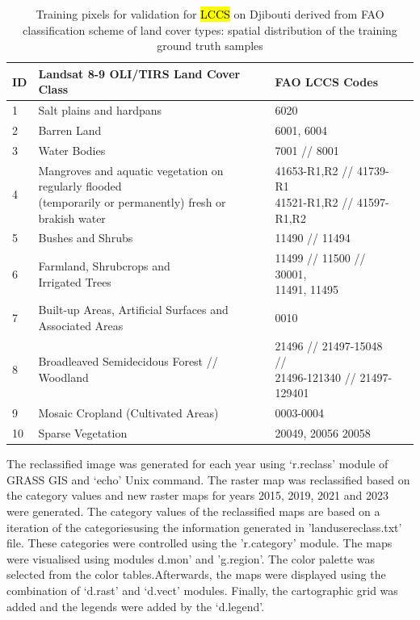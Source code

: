 \documentclass[jimaging,article,submit,pdftex,moreauthors]{Definitions/mdpi}
\begin{document}
\begin{table}[H]
\caption{{Training pixels for validation for \hl{LCCS} on Djibouti derived from FAO classification scheme of land cover types: spatial distribution of the training ground truth samples}}\label{tabFAO}%
\small
\begin{tabularx}{\textwidth}{llll}
\toprule
ID & Landsat 8-9 OLI/TIRS Land Cover Class & FAO LCCS Codes  \\
\midrule

       1 & Salt plains and hardpans & 6020 \\ \midrule
        2 & Barren Land & 6001, 6004  \\ \midrule
        3 & Water Bodies & 7001 // 8001  \\ \midrule
        4 & \makecell{Mangroves and aquatic vegetation on regularly flooded \\(temporarily or permanently) fresh or brakish water} & \makecell{41653-R1,R2 // 41739-R1 \\ 41521-R1,R2 // 41597-R1,R2}  \\ \midrule
        5 & Bushes and Shrubs & 11490 // 11494 \\ \midrule
        6 & \makecell{Farmland, Shrubcrops and \\Irrigated Trees} & \makecell{11499 // 11500 // 30001, \\11491, 11495}  \\ \midrule
        7 & Built-up Areas, Artificial Surfaces and Associated Areas & 0010  \\ \midrule
        8 & Broadleaved Semidecidous Forest // Woodland & \makecell{21496 // 21497-15048 // \\21496-121340 // 21497-129401} \\  \midrule
        9 & Mosaic Cropland (Cultivated Areas) & 0003-0004 \\ \midrule
        10 & Sparse Vegetation & 20049, 20056 20058  \\
\bottomrule
\end{tabularx}
\end{table}

{The reclassified }image was generated for each year using ‘r.reclass’ module of GRASS GIS {and} ‘echo’ Unix command.{ }The raster map was reclassified based on the category values and new raster maps for years 2015, 2019, 2021 and 2023 were {generated}. The category values of the reclassified maps are based on a {iteration} of the categoriesusing the information generated in 'landusereclass.txt' file. {These} categories were {controlled} using the 'r.category' module. The maps were{ }visualised using{ }modules {d.mon' and 'g.region'}.  The color palette was {selected from the} color tables.{Afterwards, the maps} were displayed using the combination of ‘d.rast’ and ‘d.vect’ {modules}. {Finally, }the cartographic grid was added {and} the legends were added by the ‘d.legend’.
\end{document}
